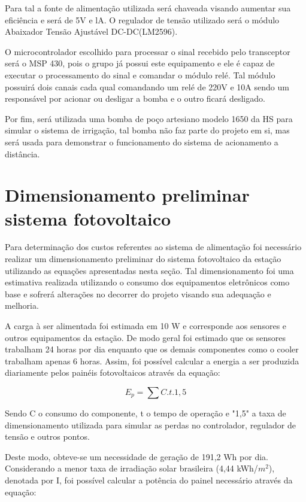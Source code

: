 Para tal a fonte de alimentação utilizada será chaveada visando aumentar sua eficiência e será de 5V e lA. O regulador de tensão utilizado será o módulo Abaixador Tensão Ajustável DC-DC(LM2596).

O microcontrolador escolhido para processar o sinal recebido pelo transceptor será o MSP 430, pois o grupo já possui este equipamento e ele é capaz de executar o processamento do sinal e comandar o módulo relé. Tal módulo possuirá dois canais cada qual comandando um relé de 220V e 10A sendo um responsável por acionar ou desligar a bomba e o outro ficará desligado.

Por fim, será utilizada uma bomba de poço artesiano modelo 1650 da HS para simular o sistema de irrigação, tal bomba não faz parte do projeto em si, mas será usada para demonstrar o funcionamento do sistema de acionamento a distância.

\section{Dimensionamento preliminar sistema fotovoltaico}


Para determinação dos custos referentes ao sistema de alimentação foi necessário realizar um dimensionamento preliminar do sistema fotovoltaico da estação utilizando as equações apresentadas nesta seção. Tal dimensionamento foi uma estimativa realizada utilizando o consumo dos equipamentos eletrônicos como base e sofrerá alterações no decorrer do projeto visando sua adequação e melhoria.

A carga à ser alimentada foi estimada em 10 W e corresponde aos sensores e outros equipamentos da estação. De modo geral foi estimado que os sensores trabalham 24 horas por dia enquanto que os demais componentes como o cooler trabalham apenas 6 horas. Assim, foi possível calcular a energia a ser produzida diariamente pelos painéis fotovoltaicos através da equação:

\begin{equation}
E_p = \sum C.t.1,5
\end{equation}

Sendo C o consumo do componente, t o tempo de operação e "1,5" a taxa de dimensionamento utilizada para simular as perdas no controlador, regulador de tensão e outros pontos. 

Deste modo, obteve-se um necessidade de geração de 191,2 Wh por dia. Considerando a menor taxa de irradiação solar brasileira (4,44 kWh/$m^2$), denotada por I, foi possível calcular a potência do painel necessário através da equação:


